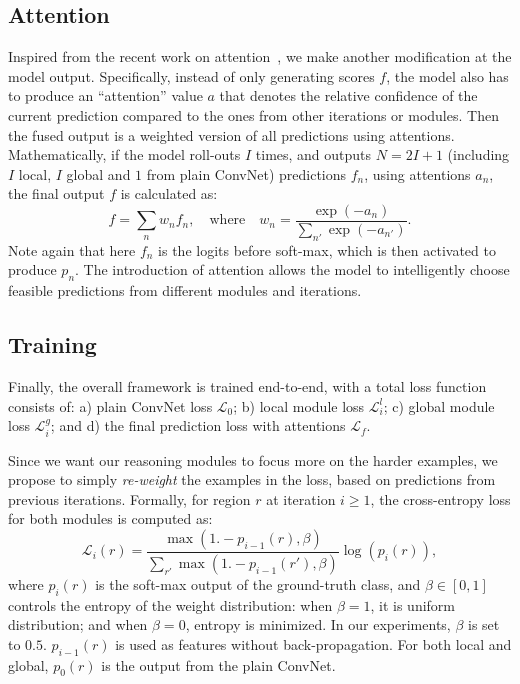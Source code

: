 \documentclass[10pt,twocolumn,letterpaper]{article}
\begin{document}
\subsection{Attention\label{attend}}
Inspired from the recent work on attention~\cite{chen2016attention}, we make another modification at the model output. Specifically, instead of only generating scores $f$, the model also has to produce an ``attention'' value $a$ that denotes the relative confidence of the current prediction compared to the ones from other iterations or modules. Then the fused output is a weighted version of all predictions using attentions. Mathematically, if the model roll-outs $I$ times, and outputs $N{=}2I{+}1$ (including $I$ local, $I$ global and $1$ from plain ConvNet) predictions $f_n$, using attentions $a_n$, the final output $f$ is calculated as:
\begin{equation}\label{att}
    f = \sum_{n}{w_n f_n}, \quad\mathrm{where}\quad w_n=\frac{\exp(-a_n)}{\sum_{n'}{\exp(-a_{n'})}}.
\end{equation}
Note again that here $f_n$ is the logits before soft-max, which is then activated to produce $p_n$. The introduction of attention allows the model to intelligently choose feasible predictions from different modules and iterations.

\subsection{Training\label{train}}
Finally, the overall framework is trained end-to-end, with a total loss function consists of: a) plain ConvNet loss $\mathcal{L}_{0}$; b) local module loss $\mathcal{L}^l_{i}$; c) global module loss $\mathcal{L}^g_{i}$; and d) the final prediction loss with attentions $\mathcal{L}_f$.

Since we want our reasoning modules to focus more on the harder examples, we propose to simply \emph{re-weight} the examples in the loss, based on predictions from previous iterations. Formally, for region $r$ at iteration $i{\ge}1$, the cross-entropy loss for both modules is computed as: 
\begin{equation}\label{reweight}
    \mathcal{L}_{i}(r) = \frac{\max(1. - p_{i-1}(r), \beta)}{\sum_{r'}\max(1. - p_{i-1}(r'), \beta)}\log(p_{i}(r)),
\end{equation}
where $p_{i}(r)$ is the soft-max output of the ground-truth class, and $\beta{\in}[0,1]$ controls the entropy of the weight distribution: when $\beta{=}1$, it is uniform distribution; and when $\beta{=}0$, entropy is minimized. In our experiments, $\beta$ is set to $0.5$. $p_{i-1}(r)$ is used as features without back-propagation. For both local and global, $p_{0}(r)$ is the output from the plain ConvNet. 
\end{document}
